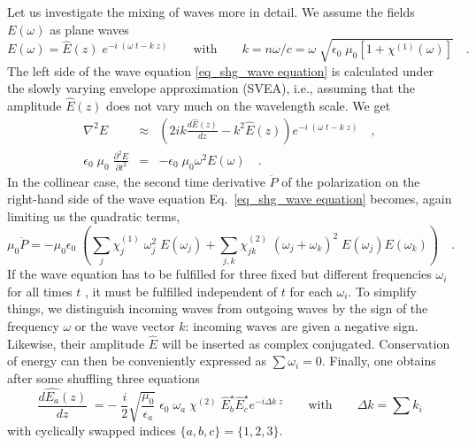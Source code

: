 Let us investigate the mixing of waves more in detail.
We assume the fields $E(\omega)$ as plane waves
\begin{equation}
  E(\omega) = \hat{E}(z) \; e^{-i \; (\omega \;
  t - k \; z)} \qquad \text{with} \qquad k = n
  \omega / c = \omega \; \sqrt{\epsilon_0 \; \mu_0 [1+
  \chi^{(1)}(\omega)]} \quad.
\end{equation}
The left side of the wave equation
\ref{eq_shg_wave equation} is calculated under the slowly varying envelope approximation (SVEA), i.e., assuming that 
 the amplitude $ \hat{E}(z)$ does not vary much on the wavelength scale. We get
\begin{eqnarray}
 \nabla^2 E & \approx &  \left( 2 i k \frac{d
 \hat{E}(z)}{dz} - k^2 \hat{E}(z) \right) e^{-i \; (\omega \;
  t - k \; z)}  \quad ,\label{gl_theo_nlo_nabla2E}\\
%
 \epsilon_0 \; \mu_0 \; \frac{\partial^2 E}{\partial t^2} &=& -   \epsilon_0 \;
 \mu_0 \omega^2 E(\omega)  \quad .\label{gl_theo_nlo_partial2E_t2}
\end{eqnarray}
%
In the collinear case, the second time derivative 
$\ddot{P}$ of the polarization on the right-hand side of the wave equation Eq.~\ref{eq_shg_wave equation} becomes, again limiting us the quadratic terms, 
\begin{equation}
  \mu_0 \ddot{P} = - \mu_0 \epsilon_0 \; \left( \sum_j \chi^{(1)}_{j}\; \omega_j^2 \; E(\omega_j)
     + \sum_{j,k} \chi^{(2)}_{jk} \; (\omega_j + \omega_k)^2 \; E(\omega_j) E(\omega_k) \right) \quad .
     \label{gl_theo_nlo_ddot_p}
\end{equation}
If the wave equation  has to be fulfilled for
three fixed but different frequencies $\omega_i$ for all
times $t$ , it must be fulfilled independent of  $t$ for each
$\omega_i$. To simplify things, we distinguish 
incoming waves from outgoing waves by the sign of the
frequency $\omega$ or the wave vector $k$: 
incoming waves are given a negative sign.
Likewise, their amplitude $\hat{E}$ will be inserted as complex conjugated. Conservation of energy can then be conveniently expressed as $\sum
\omega_i = 0$. Finally, one obtains after some shuffling
 three
equations 
\begin{equation}
 \frac{d  \hat{E_a}(z)}{dz} \;
= %
- \; \frac{i}{2}   \sqrt{ \frac{\mu_0} {\epsilon_a}}\;\epsilon_0
  \; \omega_a \; \chi^{(2)} \; \hat{E}_b^{\star} \hat{E}_c^{\star}  e^{-i  \Delta k \; z}
  \qquad \text{with} \qquad \Delta k = \sum k_i
  \label{eq_shg_e_of_z_nl}
\end{equation}
with  cyclically swapped  indices
$\{a,b,c\} = \{1,2,3\} $.


